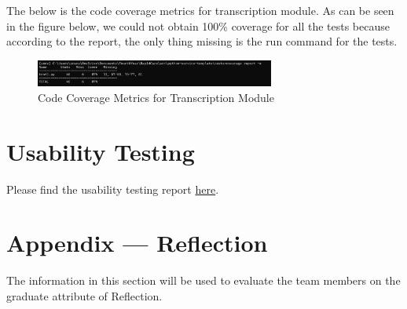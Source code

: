 \documentclass[12pt, titlepage]{article}
\begin{document}
\clearpage

The below is the code coverage metrics for transcription module. As can be seen in the figure below, we could not obtain 100\% coverage for all the tests because according to the report, the only thing missing is the run command for the tests.

\begin{figure}[h]
  \centering
  \includegraphics[width=0.7\textwidth]{Vtttest.jpg}
  \caption{Code Coverage Metrics for Transcription Module}
  \label{FigUH}
\end{figure}

\clearpage

\section{Usability Testing}

Please find the usability testing report \href{https://github.com/PKALXI/RapidCare/blob/main/docs/Extras/UsabilityTesting/UsabilityTestingReport.pdf}{here}.

\clearpage





\newpage{}
\section*{Appendix --- Reflection}

The information in this section will be used to evaluate the team members on the
graduate attribute of Reflection.


\end{document}
